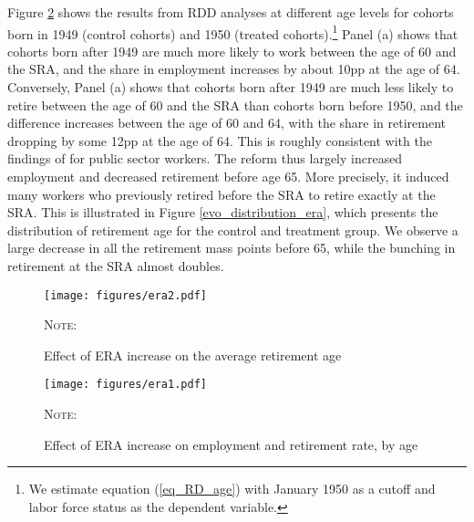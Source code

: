 \documentclass[12pt,a4paper]{article}
\begin{document}
Figure \ref{fullRD_era} shows the results from RDD analyses at different age levels for cohorts born in 1949 (control cohorts) and 1950 (treated cohorts).\footnote{We estimate equation (\ref{eq_RD_age}) with January 1950 as a cutoff and labor force status as the dependent variable.} Panel (a) shows that cohorts born after 1949 are much more likely to work between the age of 60 and the SRA, and the share in employment increases by about 10pp at the age of 64. Conversely, Panel (a) shows that cohorts born after 1949 are much less likely to retire between the age of 60 and the SRA than cohorts born before 1950, and the difference increases between the age of 60 and 64, with the share in retirement dropping by some 12pp at the age of 64. This is roughly consistent with the findings of \cite{lindeboom_montizaan_2020} for public sector workers.
The reform thus largely increased employment and decreased retirement before age 65. More precisely, it induced many workers who previously retired before the SRA to retire exactly at the SRA. This is illustrated in Figure \ref{evo_distribution_era}, which presents the distribution of retirement age for the control and treatment group. We observe a large decrease in all the retirement mass points before 65, while the bunching in retirement at the SRA almost doubles. 

\begin{figure}[!t]
	\centering
	\begin{adjustwidth}{-0.5in}{-0.5in}
		\centering
		\caption{Effect of ERA increase on the average retirement age}
		\label{RD_average_era}
		\texttt{[image: figures/era2.pdf]}
	\end{adjustwidth}
	\begin{minipage}{14cm}%
		\scriptsize
		\textsc{Note:} 
	\end{minipage}%
\end{figure}

\begin{figure}[p]
	\centering
	\begin{adjustwidth}{-0.5in}{-0.5in}
		\caption{Effect of ERA increase on employment and retirement rate, by age}
		\label{fullRD_era}
			\centering
		\texttt{[image: figures/era1.pdf]}
	\end{adjustwidth}
	
	\begin{minipage}{14cm}%
		\scriptsize
		\textsc{Note:} 
	\end{minipage}%
\end{figure}
\end{document}
